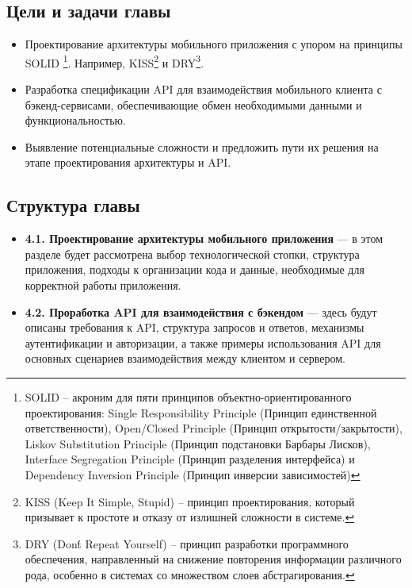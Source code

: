 \subsection*{Цели и задачи главы}

\begin{itemize}
    \item Проектирование архитектуры мобильного приложения с упором на принципы SOLID \footnote{SOLID – акроним для пяти принципов объектно-ориентированного проектирования: Single Responsibility Principle (Принцип единственной ответственности), Open/Closed Principle (Принцип открытости/закрытости), Liskov Substitution Principle (Принцип подстановки Барбары Лисков), Interface Segregation Principle (Принцип разделения интерфейса) и Dependency Inversion Principle (Принцип инверсии зависимостей)}. Например, KISS\footnote{KISS (Keep It Simple, Stupid) – принцип проектирования, который призывает к простоте и отказу от излишней сложности в системе.} и DRY\footnote{DRY (Don\'t Repeat Yourself) – принцип разработки программного обеспечения, направленный на снижение повторения информации различного рода, особенно в системах со множеством слоев абстрагирования.}.
    \item Разработка спецификации API для взаимодействия мобильного клиента с бэкенд-сервисами, обеспечивающие обмен необходимыми данными и функциональностью.
    \item Выявление потенциальные сложности и предложить пути их решения на этапе проектирования архитектуры и API.
\end{itemize}

\subsection*{Структура главы}

\begin{itemize}
    \item \textbf{4.1. Проектирование архитектуры мобильного приложения} — в этом разделе будет рассмотрена выбор технологической стопки, структура приложения, подходы к организации кода и данные, необходимые для корректной работы приложения.
    \item \textbf{4.2. Проработка API для взаимодействия с бэкендом} — здесь будут описаны требования к API, структура запросов и ответов, механизмы аутентификации и авторизации, а также примеры использования API для основных сценариев взаимодействия между клиентом и сервером.
\end{itemize}


